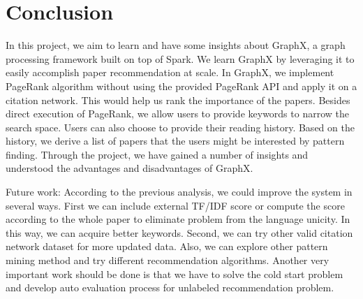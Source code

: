 \section{Conclusion} \label{sec:conclusion}
%
In this project, we aim to learn and have some insights about GraphX, a graph processing framework built on top of Spark.
%
We learn GraphX by leveraging it to easily accomplish paper recommendation at scale.
%
In GraphX, we implement PageRank algorithm without using the provided PageRank API and apply it on a citation network.
%
This would help us rank the importance of the papers.
%
Besides direct execution of PageRank, we allow users to provide keywords to narrow the search space.
%
Users can also choose to provide their reading history.
%
Based on the history, we derive a list of papers that the users might be interested by pattern finding.
%
Through the project, we have gained a number of insights and understood the advantages and disadvantages of GraphX.

Future work:
According to the previous analysis, we could improve the system in several ways. First we can include external TF/IDF score or compute the score according to the whole paper to eliminate problem from the language unicity. In this way, we can acquire better keywords. Second, we can try other valid citation network dataset for more updated data. Also, we can explore other pattern mining method and try different recommendation algorithms. Another very important work should be done is that we have to solve the cold start problem and develop auto evaluation process for unlabeled recommendation problem. 
